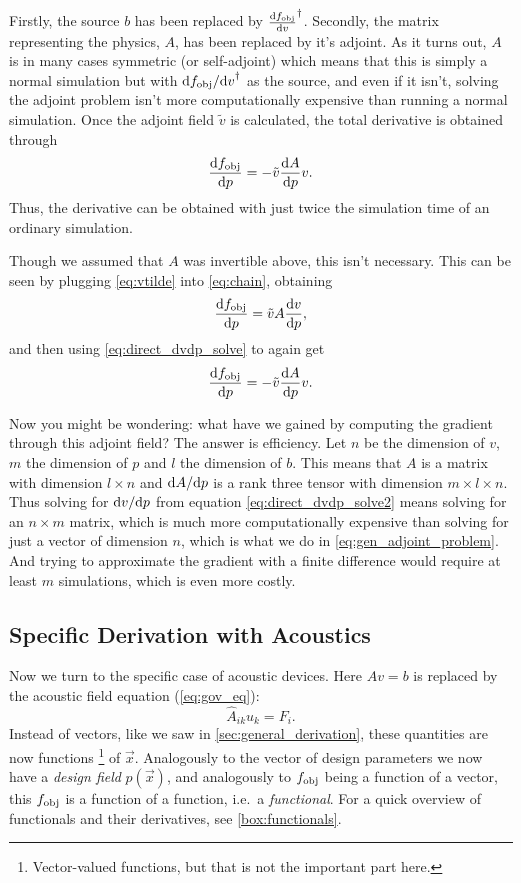 Firstly, the source $b$ has been replaced by $\diff{\fobj}{v}^\dagger$.
Secondly, the matrix representing the physics, $A$, has been replaced by it's
adjoint.
As it turns out, $A$ is in many cases symmetric (or self-adjoint) which means that this is simply a normal
simulation but with $\difs{\fobj}{v}^\dagger$ as the source, and even if it
isn't, solving the adjoint problem isn't more computationally expensive than
running a normal simulation.
Once the adjoint field $\tilde v$ is calculated, the total derivative is
obtained through
\begin{equation}
	\label{eq:dfdp_vtilde}
	\diff{\fobj}{p} =
	-\tilde v \diff{A}{p} v.
\end{equation}
Thus, the derivative can be obtained with just twice the simulation time
of an ordinary simulation.

Though we assumed that $A$ was invertible above, this isn't necessary.
This can be seen by plugging \cref{eq:vtilde} into \cref{eq:chain}, obtaining
\begin{equation}
	\diff{\fobj}{p} =
	\tilde v A \diff{v}{p},
\end{equation}
and then using \cref{eq:direct_dvdp_solve} to again get
\begin{equation}
	\diff{\fobj}{p} =
	-\tilde v \diff{A}{p} v.
\end{equation}

Now you might be wondering: what have we gained by computing the gradient
through this adjoint field?
The answer is efficiency.
Let $n$ be the dimension of $v$, $m$ the dimension of $p$ and $l$ the dimension
of $b$.
This means that $A$ is a matrix with dimension $l\times n$ and $\difs{A}{p}$ is
a rank three tensor with dimension $m\times l\times n$.
Thus solving for $\difs{v}{p}$ from equation \cref{eq:direct_dvdp_solve2}
means solving for an $n \times m$ matrix, which is much more computationally
expensive than solving for just a vector of dimension $n$, which is what we do
in \cref{eq:gen_adjoint_problem}.
And trying to approximate the gradient with a finite difference would require at
least $m$ simulations, which is even more costly.

\subsection{Specific Derivation with Acoustics}\label{sec:spec_der}

Now we turn to the specific case of acoustic devices.
Here $A v = b$ is replaced by the acoustic field equation (\cref{eq:gov_eq}):
\begin{equation}\label{eq:sim_eq}
	\hat A_{ik} u_k = F_i.
\end{equation}
Instead of vectors, like we saw in \cref{sec:general_derivation}, these quantities are now functions%
\footnote{%
	Vector-valued functions, but that is not the important part here.
}
of $\vec x$.
Analogously to the vector of design parameters we now have a \emph{design field}
$p(\vec x)$,
and analogously to $f_\text{obj}$ being a function of a vector, this $f_\text{obj}$ is a
function of a function, i.e.\ a \emph{functional}.
For a quick overview of functionals and their derivatives, see
\cref{box:functionals}.

